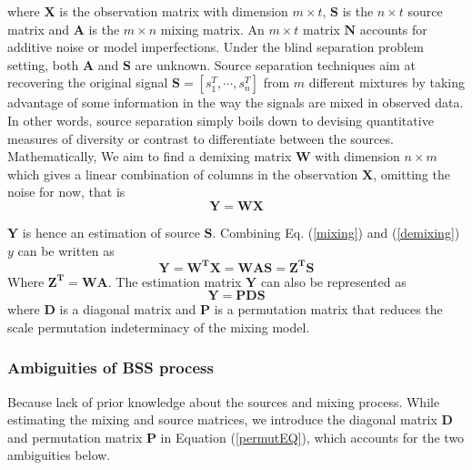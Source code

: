 where $\mathbf{X}$ is the observation matrix with dimension $m \times t$, $\mathbf{S}$ is the $n\times t$ source matrix and $\mathbf{A}$ is the $m \times n$ mixing matrix. An $m \times t$ matrix $\mathbf{N}$ accounts for additive noise or model imperfections. Under the blind separation problem setting, both $\mathbf{A}$ and $\mathbf{S}$ are unknown.  %
Source separation techniques aim at recovering the original signal $\mathbf{S} = [s_1^T,\cdots, s_n^T]$ from $m$ different mixtures by taking advantage of some information in the way the signals are mixed in observed data. In other words, source separation simply boils down to devising quantitative measures of diversity or contrast to differentiate between the sources.\\

Mathematically, We aim to find a demixing matrix $\mathbf{W}$ with dimension $n \times m$ which gives a linear combination of columns in the  observation $\mathbf{X}$, omitting the noise for now, that is
\begin{equation}
    \mathbf{Y} = \mathbf{WX}
    \label{demixing}
\end{equation}

$\mathbf{Y}$ is hence an estimation of source $\mathbf{S}$.
Combining Eq. (\ref{mixing}) and (\ref{demixing}) $y$ can be written as
\begin{equation}
    \mathbf{Y} = \mathbf{W^T} \mathbf{X} = \mathbf{W A S} = \mathbf{Z^T S}
    \label{estimationYandZ}
\end{equation}
Where $\mathbf{Z^T} = \mathbf{W A}$. The estimation matrix $\mathbf{Y}$ can also be represented as 
\begin{equation}
    \mathbf{Y} = \mathbf{PDS} 
    \label{permutEQ}
\end{equation}
where $\mathbf{D}$ is a diagonal matrix and $\mathbf{P}$ is a permutation matrix that reduces the scale permutation indeterminacy of the mixing model.

\subsubsection{Ambiguities of BSS process}
\label{ambiguitiesBSS}
Because lack of prior knowledge about the sources and mixing process. While estimating the mixing and source matrices, we introduce the diagonal matrix $\mathbf{D}$ and permutation matrix $\mathbf{P}$ in Equation (\ref{permutEQ}), which accounts for the two ambiguities below.


